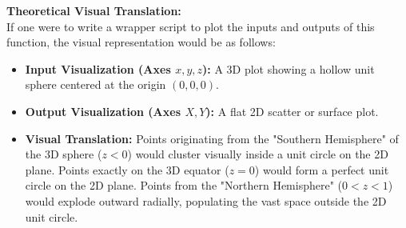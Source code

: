 \vspace{1em}
\textbf{Theoretical Visual Translation:}\\
If one were to write a wrapper script to plot the inputs and outputs of this function, the visual representation would be as follows:
\begin{itemize}
    \item \textbf{Input Visualization (Axes $x, y, z$):} A 3D plot showing a hollow unit sphere centered at the origin $(0,0,0)$. 
    \item \textbf{Output Visualization (Axes $X, Y$):} A flat 2D scatter or surface plot. 
    \item \textbf{Visual Translation:} Points originating from the "Southern Hemisphere" of the 3D sphere ($z < 0$) would cluster visually inside a unit circle on the 2D plane. Points exactly on the 3D equator ($z = 0$) would form a perfect unit circle on the 2D plane. Points from the "Northern Hemisphere" ($0 < z < 1$) would explode outward radially, populating the vast space outside the 2D unit circle.
\end{itemize}


